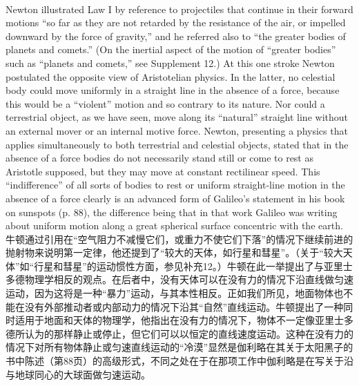 \documentclass{article}
\begin{document}
\\
Newton illustrated Law I by reference to projectiles that continue in their forward motions ``so far as they are not retarded by the resistance of the air, or impelled downward by the force of gravity,'' and he referred also to ``the greater bodies of planets and comets.'' (On the inertial aspect of the motion of ``greater bodies'' such as ``planets and comets,'' see Supplement 12.) At this one stroke Newton postulated the opposite view of Aristotelian physics. In the latter, no celestial body could move uniformly in a straight line in the absence of a force, because this would be a ``violent'' motion and so contrary to its nature. Nor could a terrestrial object, as we have seen, move along its ``natural'' straight line without an external mover or an internal motive force. Newton, presenting a physics that applies simultaneously to both terrestrial and celestial objects, stated that in the absence of a force bodies do not necessarily stand still or come to rest as Aristotle supposed, but they may move at constant rectilinear speed. This ``indifference'' of all sorts of bodies to rest or uniform straight-line motion in the absence of a force clearly is an advanced form of Galileo's statement in his book on sunspots (p. 88), the difference being that in that work Galileo was writing about uniform motion along a great spherical surface concentric with the earth.\\
牛顿通过引用在“空气阻力不减慢它们，或重力不使它们下落”的情况下继续前进的抛射物来说明第一定律，他还提到了“较大的天体，如行星和彗星”。（关于“较大天体”如“行星和彗星”的运动惯性方面，参见补充12。）牛顿在此一举提出了与亚里士多德物理学相反的观点。在后者中，没有天体可以在没有力的情况下沿直线做匀速运动，因为这将是一种“暴力”运动，与其本性相反。正如我们所见，地面物体也不能在没有外部推动者或内部动力的情况下沿其“自然”直线运动。牛顿提出了一种同时适用于地面和天体的物理学，他指出在没有力的情况下，物体不一定像亚里士多德所认为的那样静止或停止，但它们可以以恒定的直线速度运动。这种在没有力的情况下对所有物体静止或匀速直线运动的“冷漠”显然是伽利略在其关于太阳黑子的书中陈述（第88页）的高级形式，不同之处在于在那项工作中伽利略是在写关于沿与地球同心的大球面做匀速运动。\\
\end{document}
